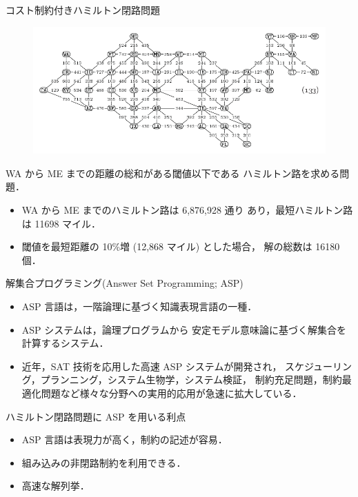 \documentclass[dvipdfmx,11pt]{beamer}
\begin{document}
\begin{frame}{コスト制約付きハミルトン閉路問題}
  \begin{figure}[tb]
  \centering
  \includegraphics[width=0.8\linewidth]{fig/taocp_vol4fasc1b_p52_eq133.pdf}
  \end{figure}
  WA から ME までの距離の総和がある閾値以下である
  ハミルトン路を求める問題．
  \begin{itemize}
  \item WA から ME までのハミルトン路は 6,876,928 通り
    あり，最短ハミルトン路は 11698 マイル．
  \item 閾値を最短距離の 10\%増 (12,868 マイル) とした場合，
    解の総数は 16180 個．
  \end{itemize}
   
\end{frame}

\begin{frame}{解集合プログラミング(Answer Set Programming; ASP)}
  \begin{itemize}
  \item \alert{ASP 言語}は，一階論理に基づく知識表現言語の一種．
  \item \alert{ASP システム}は，論理プログラムから
    安定モデル意味論に基づく解集合を計算するシステム．
  \item 近年，SAT 技術を応用した高速 ASP システムが開発され，
    スケジューリング，プランニング，システム生物学，システム検証，
    制約充足問題，制約最適化問題など様々な分野への実用的応用が急速に拡大している．
  \end{itemize}

  \begin{alertblock}{ハミルトン閉路問題に ASP を用いる利点}
    \begin{itemize}
    \item ASP 言語は表現力が高く，制約の記述が容易．
    \item 組み込みの非閉路制約を利用できる．
    \item 高速な解列挙．
    \end{itemize}
  \end{alertblock}
\end{frame}
\end{document}
